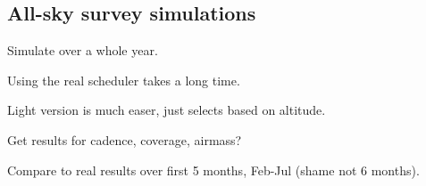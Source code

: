 \begin{colsection}
\subsection{All-sky survey simulations}
\label{sec:allsky_sims}
\begin{colsection}

Simulate over a whole year.

Using the real scheduler takes a long time.

Light version is much easer, just selects based on altitude.

Get results for cadence, coverage, airmass?

Compare to real results over first 5 months, Feb-Jul (shame not 6 months).

\end{colsection}


\end{colsection}

